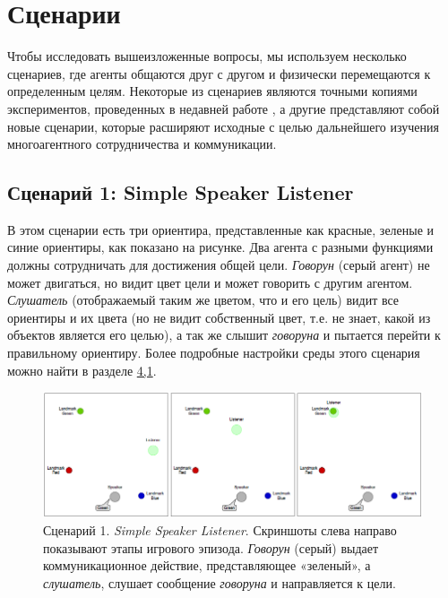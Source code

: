 \section{Сценарии} \label{intro:sec2}

Чтобы исследовать вышеизложенные вопросы, мы используем несколько сценариев, где агенты общаются друг с другом и физически перемещаются к определенным целям. Некоторые из сценариев являются точными копиями экспериментов, проведенных в недавней работе \cite{lowe2017multiagent}, а другие представляют собой новые сценарии, которые расширяют исходные с целью дальнейшего изучения многоагентного сотрудничества и коммуникации.

\subsection{Сценарий 1: Simple Speaker Listener} \label{intro:ssl}

В этом сценарии есть три ориентира, представленные как красные, зеленые и синие ориентиры, как показано на рисунке. Два агента с разными функциями должны сотрудничать для достижения общей цели. \textit{Говорун} (серый агент) не может двигаться, но видит цвет цели и может говорить с другим агентом. \textit{Слушатель} (отображаемый таким же цветом, что и его цель) видит все ориентиры и их цвета (но не видит собственный цвет, т.е. не знает, какой из объектов является его целью), а так же слышит \textit{говоруна} и пытается перейти к правильному ориентиру. Более подробные настройки среды этого сценария можно найти в разделе \hyperref[ch4:exp-ssl]{4,1}.

\begin{figure}[ht!] 
	\center
	\includegraphics [scale=0.80] {my_folder/images/fig0-1-simple-speaker-listener.png}
	\caption{Сценарий 1. \textit{Simple Speaker Listener}. Скриншоты слева направо показывают этапы игрового эпизода. \textit{Говорун} (серый) выдает коммуникационное действие, представляющее «зеленый», а \textit{слушатель}, слушает сообщение \textit{говоруна} и направляется к цели.} 
	\label{fig:0-1-simple-speaker-listener}  
\end{figure}

